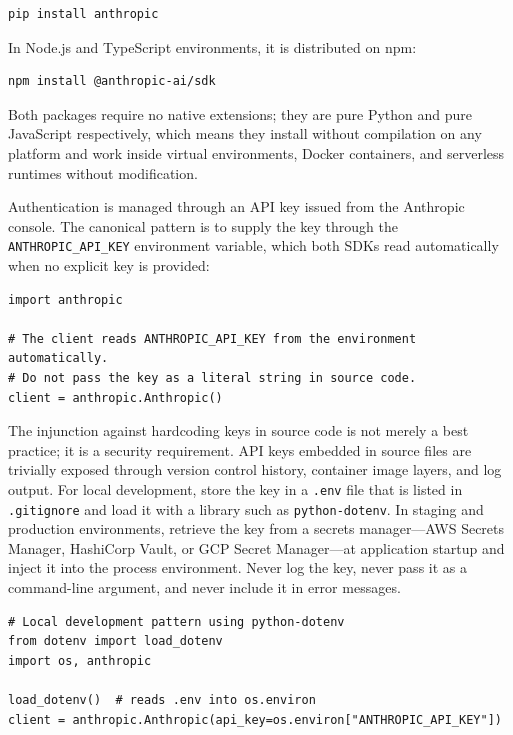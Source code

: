 \begin{verbatim}
pip install anthropic
\end{verbatim}

In Node.js and TypeScript environments, it is distributed on npm:

\begin{verbatim}
npm install @anthropic-ai/sdk
\end{verbatim}

Both packages require no native extensions; they are pure Python and pure
JavaScript respectively, which means they install without compilation on any
platform and work inside virtual environments, Docker containers, and serverless
runtimes without modification.

Authentication is managed through an API key issued from the Anthropic console. The
canonical pattern is to supply the key through the \texttt{ANTHROPIC\_API\_KEY}
environment variable, which both SDKs read automatically when no explicit key is
provided:

\begin{verbatim}
import anthropic

# The client reads ANTHROPIC_API_KEY from the environment automatically.
# Do not pass the key as a literal string in source code.
client = anthropic.Anthropic()
\end{verbatim}

The injunction against hardcoding keys in source code is not merely a best practice; it
is a security requirement. API keys embedded in source files are trivially exposed
through version control history, container image layers, and log output. For local
development, store the key in a \texttt{.env} file that is listed in \texttt{.gitignore}
and load it with a library such as \texttt{python-dotenv}. In staging and production
environments, retrieve the key from a secrets manager---AWS Secrets Manager, HashiCorp
Vault, or GCP Secret Manager---at application startup and inject it into the process
environment. Never log the key, never pass it as a command-line argument, and never
include it in error messages.

\begin{verbatim}
# Local development pattern using python-dotenv
from dotenv import load_dotenv
import os, anthropic

load_dotenv()  # reads .env into os.environ
client = anthropic.Anthropic(api_key=os.environ["ANTHROPIC_API_KEY"])
\end{verbatim}

